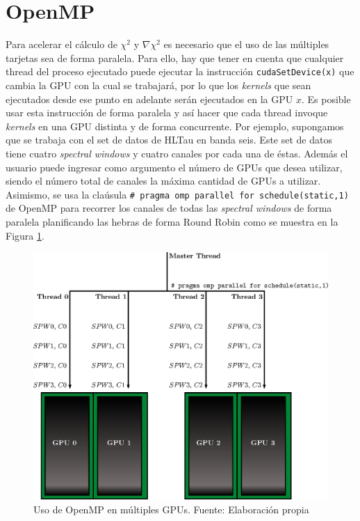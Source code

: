 \section{OpenMP}

Para acelerar el cálculo de $\chi^{2}$ y $\nabla \chi^{2}$ es necesario que el uso de las múltiples tarjetas sea de forma paralela. Para ello, hay que tener en cuenta que cualquier thread del proceso ejecutado puede ejecutar la instrucción \texttt{cudaSetDevice(x)} que cambia la GPU con la cual se trabajará, por lo que los \textit{kernels} que sean ejecutados desde ese punto en adelante serán ejecutados en la GPU $x$. Es posible usar esta instrucción de forma paralela y así hacer que cada thread invoque \textit{kernels} en una GPU distinta y de forma concurrente. Por ejemplo, supongamos que se trabaja con el set de datos de HLTau en banda seis. Este set de datos tiene cuatro \textit{spectral windows} y cuatro canales por cada una de éstas. Además el usuario puede ingresar como argumento el número de GPUs que desea utilizar, siendo el número total de canales la máxima cantidad de GPUs a utilizar. Asimismo, se usa la claúsula \texttt{\# pragma omp parallel for schedule(static,1)} de OpenMP para recorrer los canales de todas las \textit{spectral windows} de forma paralela planificando las hebras de forma Round Robin como se muestra en la Figura \ref{fig:openmp}.

\begin{figure}[h!]
	\centering
	\includegraphics[scale=0.8]{./images/openmp.eps}
	\caption{Uso de OpenMP en múltiples GPUs. Fuente: Elaboración propia}
	\label{fig:openmp}
\end{figure}

